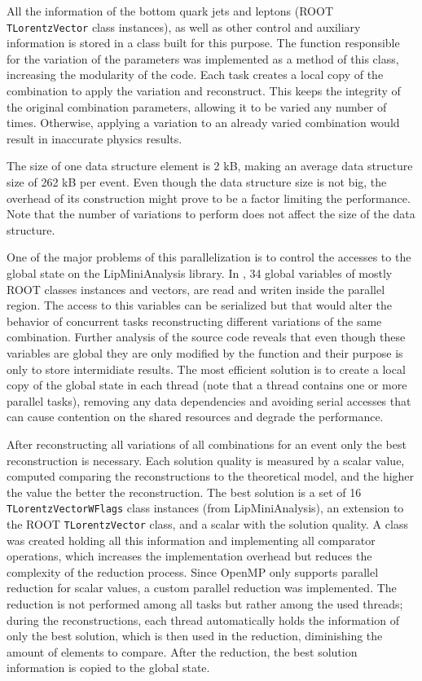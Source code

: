 All the information of the bottom quark jets and leptons (ROOT \texttt{TLorentzVector} class instances), as well as other control and auxiliary information is stored in a class built for this purpose. The function responsible for the variation of the parameters was implemented as a method of this class, increasing the modularity of the code. Each task creates a local copy of the combination to apply the variation and reconstruct. This keeps the integrity of the original combination parameters, allowing it to be varied any number of times. Otherwise, applying a variation to an already varied combination would result in inaccurate physics results.

The size of one data structure element is 2 kB, making an average data structure size of 262 kB per event. Even though the data structure size is not big, the overhead of its construction might prove to be a factor limiting the performance. Note that the number of variations to perform does not affect the size of the data structure.

One of the major problems of this parallelization is to control the accesses to the global state on the LipMiniAnalysis library. In \ttDilepKinFit, 34 global variables of mostly ROOT classes instances and vectors, are read and writen inside the parallel region. The access to this variables can be serialized but that would alter the behavior of concurrent tasks reconstructing different variations of the same combination. Further analysis of the source code reveals that even though these variables are global they are only modified by the \ttDilepKinFit function and their purpose is only to store intermidiate results. The most efficient solution is to create a local copy of the global state in each thread (note that a thread contains one or more parallel tasks), removing any data dependencies and avoiding serial accesses that can cause contention on the shared resources and degrade the performance.

After reconstructing all variations of all combinations for an event only the best reconstruction is necessary. Each solution quality is measured by a scalar value, computed comparing the reconstructions to the theoretical model, and the higher the value the better the reconstruction. The best solution is a set of 16 \texttt{TLorentzVectorWFlags} class instances (from LipMiniAnalysis), an extension to the ROOT \texttt{TLorentzVector} class, and a scalar with the solution quality. A class was created holding all this information and implementing all comparator operations, which increases the implementation overhead but reduces the complexity of the reduction process. Since OpenMP only supports parallel reduction for scalar values, a custom parallel reduction was implemented. The reduction is not performed among all tasks but rather among the used threads; during the reconstructions, each thread automatically holds the information of only the best solution, which is then used in the reduction, diminishing the amount of elements to compare. After the reduction, the best solution information is copied to the global state.

